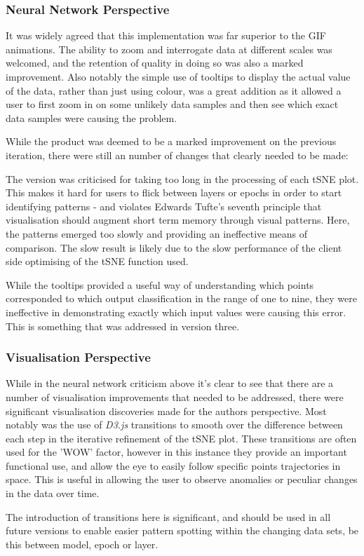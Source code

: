 \documentclass[a4paper,11pt,titlepage]{article}
\begin{document}
		\subsubsection{Neural Network Perspective}
		It was widely agreed that this implementation was far superior to the GIF animations. The ability to zoom and interrogate data at different scales was welcomed, and the retention of quality in doing so was also a marked improvement. Also notably the simple use of tooltips to display the actual value of the data, rather than just using colour, was a great addition as it allowed a user to first zoom in on some unlikely data samples and then see which exact data samples were causing the problem.
		\par 
		While the product was deemed to be a marked improvement on the previous iteration, there were still an number of changes that clearly needed to be made:
		\par 
		The version was criticised for taking too long in the processing of each tSNE plot. This makes it hard for users to flick between layers or epochs in order to start identifying patterns - and violates Edwards Tufte's seventh principle that visualisation should augment short term memory through visual patterns. Here, the patterns emerged too slowly and providing an ineffective means of comparison. The slow result is likely due to the slow performance of the client side optimising of the tSNE function used. 
		\par 
		While the tooltips provided a useful way of understanding which points corresponded to which output classification in the range of one to nine, they were ineffective in demonstrating exactly which input values were causing this error. This is something that was addressed in version three.
		
		\subsubsection{Visualisation Perspective}
		While in the neural network criticism above it's clear to see that there are a number of visualisation improvements that needed to be addressed, there were significant visualisation discoveries made for the authors perspective. Most notably was the use of \textit{D3.js} transitions to smooth over the difference between each step in the iterative refinement of the tSNE plot. These transitions are often used for the 'WOW' factor, however in this instance they provide an important functional use, and allow the eye to easily follow specific points trajectories in space. This is useful in allowing the user to observe anomalies or peculiar changes in the data over time.	
		\par 
		The introduction of transitions here is significant, and should be used in all future versions to enable easier pattern spotting within the changing data sets, be this between model, epoch or layer.
	
\end{document}
